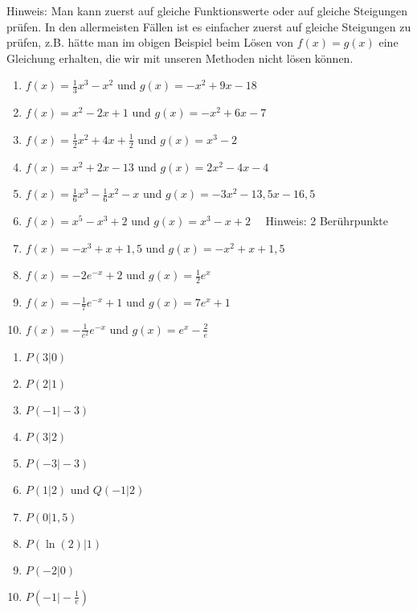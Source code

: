 \textcolor{loes}{Hinweis: Man kann zuerst auf gleiche Funktionswerte oder auf gleiche Steigungen prüfen. In den allermeisten Fällen ist es einfacher zuerst auf gleiche Steigungen zu prüfen, z.B. hätte man im obigen Beispiel beim Lösen von \(f(x)=g(x)\) eine Gleichung erhalten, die wir mit unseren Methoden nicht lösen können.}\newpage
\begin{Exercise}[title={\raggedright Bestimme jeweils den Berührpunkt der beiden Funktionen.}, label=beruehrpunkteA1]
	\begin{enumerate}[label=\alph*)]
		\item \(f(x)=\frac{1}{3}x^3-x^2\) und \(g(x)=-x^2+9x-18\)
		\item \(f(x)=x^2-2x+1\) und \(g(x)=-x^2+6x-7\)
		\item \(f(x)=\frac{1}{2}x^2+4x+\frac{1}{2}\) und \(g(x)=x^3-2\)
		\item \(f(x)=x^2+2x-13\) und \(g(x)=2x^2-4x-4\)
		\item \(f(x)=\frac{1}{6}x^3-\frac{1}{6}x^2-x\) und \(g(x)=-3x^2-13,5x-16,5\)
		\item \(f(x)=x^5-x^3+2\) und \(g(x)=x^3-x+2\quad\) Hinweis: 2 Berührpunkte
		\item \(f(x)=-x^3+x+1,5\) und \(g(x)=-x^2+x+1,5\)
		\item \(f(x)=-2e^{-x}+2\) und \(g(x)=\frac{1}{2}e^x\)
		\item \(f(x)=-\frac{1}{7}e^{-x}+1\) und \(g(x)=7e^x+1\)
		\item \(f(x)=-\frac{1}{e^2}e^{-x}\) und \(g(x)=e^x-\frac{2}{e}\)
	\end{enumerate}
\end{Exercise}
\begin{Answer}[ref=beruehrpunkteA1]
	\begin{enumerate}[label=\alph*)]
		\item \(P(3\vert0)\)
		\item \(P(2\vert1)\)
		\item \(P(-1\vert-3)\)
		\item \(P(3\vert2)\)
		\item \(P(-3\vert-3)\)
		\item \(P(1\vert2)\) und \(Q(-1\vert2)\)
		\item \(P(0\vert1,5)\)
		\item \(P(\ln(2)\vert1)\)
		\item \(P(-2\vert0)\)
		\item \(P\left(-1\vert-\frac{1}{e}\right)\)
	\end{enumerate}
\end{Answer}
